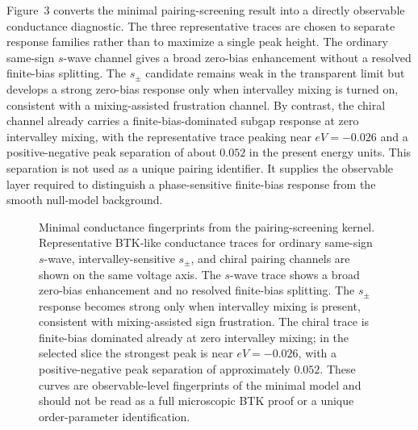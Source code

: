 
Figure~3 converts the minimal pairing-screening result into a directly observable conductance diagnostic. The three representative traces are chosen to separate response families rather than to maximize a single peak height. The ordinary same-sign $s$-wave channel gives a broad zero-bias enhancement without a resolved finite-bias splitting. The $s_{\pm}$ candidate remains weak in the transparent limit but develops a strong zero-bias response only when intervalley mixing is turned on, consistent with a mixing-assisted frustration channel. By contrast, the chiral channel already carries a finite-bias-dominated subgap response at zero intervalley mixing, with the representative trace peaking near $eV=-0.026$ and a positive-negative peak separation of about $0.052$ in the present energy units. This separation is not used as a unique pairing identifier. It supplies the observable layer required to distinguish a phase-sensitive finite-bias response from the smooth null-model background.

\begin{figure}[t]
  \centering
  \caption{\label{fig:wp3-fingerprints}
  Minimal conductance fingerprints from the pairing-screening kernel.
  Representative BTK-like conductance traces for ordinary same-sign $s$-wave, intervalley-sensitive $s_{\pm}$, and chiral pairing channels are shown on the same voltage axis.
  The $s$-wave trace shows a broad zero-bias enhancement and no resolved finite-bias splitting.
  The $s_{\pm}$ response becomes strong only when intervalley mixing is present, consistent with mixing-assisted sign frustration.
  The chiral trace is finite-bias dominated already at zero intervalley mixing; in the selected slice the strongest peak is near $eV=-0.026$, with a positive-negative peak separation of approximately $0.052$.
  These curves are observable-level fingerprints of the minimal model and should not be read as a full microscopic BTK proof or a unique order-parameter identification.}
\end{figure}

